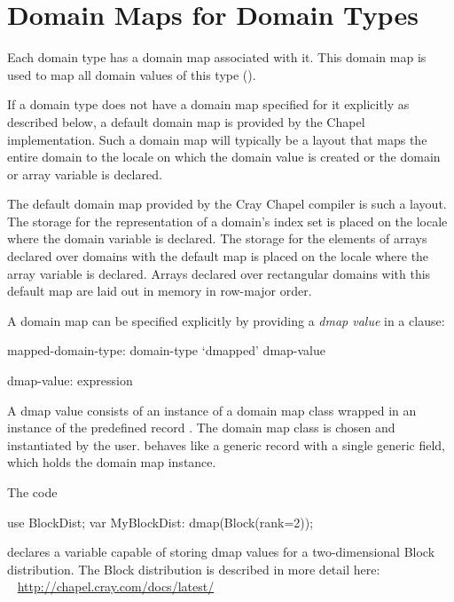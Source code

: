 \section{Domain Maps for Domain Types}
\label{Domain_Maps_For_Types}

Each domain type has a domain map associated with it.
This domain map is used to map all domain values of this type
().

If a domain type does not have a domain map specified for it
explicitly as described below,
a default domain map is provided by the Chapel implementation.
Such a domain map will typically be a layout that maps the entire domain
to the locale on which the domain value is created or
the domain or array variable is declared.

\begin{craychapel}
The default domain map provided by the Cray Chapel compiler
is such a layout. The storage for the representation of a domain's
index set is placed on the locale where the domain variable is declared.
The storage for the elements of arrays declared over domains with
the default map is placed on the locale where the array variable
is declared.
Arrays declared over rectangular domains with this default map
are laid out in memory in row-major order.
\end{craychapel}

\pagebreak
{}
A domain map can be specified explicitly by
providing a \emph{dmap value} in a  clause:

\begin{syntax}
mapped-domain-type:
  domain-type `dmapped' dmap-value

dmap-value:
  expression
\end{syntax}

A dmap value consists of an instance of a domain map class
wrapped in an instance of the predefined record .
The domain map class is chosen and instantiated by the user.
 behaves like a generic record with a single generic field,
which holds the domain map instance.

\begin{example}
The code
\begin{chapel}
use BlockDist;
var MyBlockDist: dmap(Block(rank=2));
\end{chapel}
declares a variable capable of storing dmap values
for a two-dimensional Block distribution.
The Block distribution is described in more detail here:
\\ %
\mbox{$$ $$ $$} %
\url{http://chapel.cray.com/docs/latest/}
\end{example}

